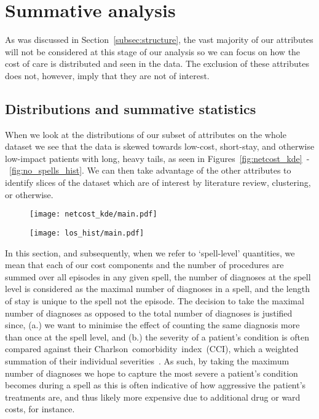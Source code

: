 \section{Summative analysis}\label{sec:summative}

As was discussed in Section~\ref{subsec:structure}, the vast majority of our
attributes will not be considered at this stage of our analysis so we can focus
on how the cost of care is distributed and seen in the data. The exclusion of
these attributes does not, however, imply that they are not of interest. 

\subsection{Distributions and summative
statistics}\label{subsec:distributions_statistics}
\graphicspath{{./img/general/}}

When we look at the distributions of our subset of attributes on the whole
dataset we see that the data is skewed towards low-cost, short-stay, and
otherwise low-impact patients with long, heavy tails, as seen in
Figures~\ref{fig:netcost_kde}~\--~\ref{fig:no_spells_hist}. We can then take
advantage of the other attributes to identify slices of the dataset which are of
interest by literature review, clustering, or otherwise.

\begin{figure}[h!]
    \centering
    \begin{minipage}{.495\textwidth}
        \texttt{[image: netcost\_kde/main.pdf]}
        \label{fig:netcost_kde}
    \end{minipage}\hfill%
    \begin{minipage}{.495\textwidth}
        \texttt{[image: los\_hist/main.pdf]}
        \label{fig:los_hist}
    \end{minipage}
\end{figure}

In this section, and subsequently, when we refer to `spell-level' quantities, we
mean that each of our cost components and the number of procedures are summed
over all episodes in any given spell, the number of diagnoses at the spell level
is considered as the maximal number of diagnoses in a spell, and the length of
stay is unique to the spell not the episode. The decision to take the maximal
number of diagnoses as opposed to the total number of diagnoses is justified
since, (a.) we want to minimise the effect of counting the same diagnosis more
than once at the spell level, and (b.) the severity of a patient's condition is
often compared against their Charlson~comorbidity~index~(CCI), which a weighted
summation of their individual severities~\cite{Thygesen2011}. As such, by taking
the maximum number of diagnoses we hope to capture the most severe a patient's
condition becomes during a spell as this is often indicative of how aggressive
the patient's treatments are, and thus likely more expensive due to additional
drug or ward costs, for instance.

